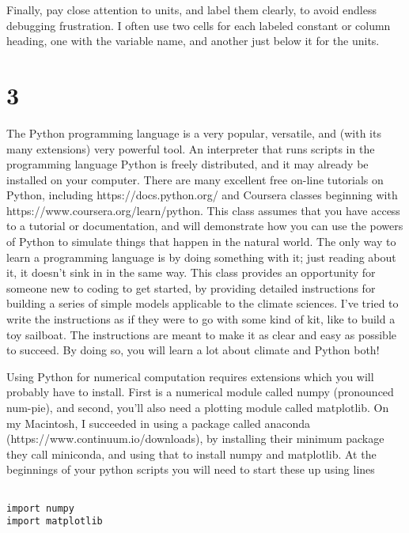 Finally, pay close attention to units, and label them clearly, to avoid endless debugging frustration. I often use two cells for each labeled constant or column heading, one with the variable name, and another just below it for the units.



\section{3}

The Python programming language is a very popular, versatile, and (with its many extensions) very powerful tool. An interpreter that runs scripts in the programming language Python is freely distributed, and it may already be installed on your computer. There are many excellent free on-line tutorials on Python, including https://docs.python.org/ and Coursera classes beginning with https://www.coursera.org/learn/python. This class assumes that you have access to a tutorial or documentation, and will demonstrate how you can use the powers of Python to simulate things that happen in the natural world. The only way to learn a programming language is by doing something with it; just reading about it, it doesn't sink in in the same way. This class provides an opportunity for someone new to coding to get started, by providing detailed instructions for building a series of simple models applicable to the climate sciences. I've tried to write the instructions as if they were to go with some kind of kit, like to build a toy sailboat. The instructions are meant to make it as clear and easy as possible to succeed. By doing so, you will learn a lot about climate and Python both!

Using Python for numerical computation requires extensions which you will probably have to install. First is a numerical module called numpy (pronounced num-pie), and second, you'll also need a plotting module called matplotlib. On my Macintosh, I succeeded in using a package called anaconda (https://www.continuum.io/downloads), by installing their minimum package they call miniconda, and using that to install numpy and matplotlib. At the beginnings of your python scripts you will need to start these up using lines


\begin{code}[]
	\begin{lstlisting}

import numpy
import matplotlib
		\end{lstlisting}
\end{code}




